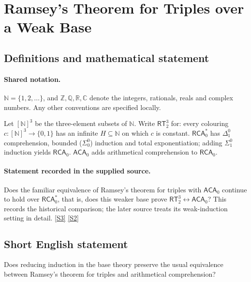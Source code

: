\documentclass[11pt]{article}
\newcommand{\sref}[2]{\hyperlink{source:#1:#2}{[S#2]}}
\begin{document}
\section{Ramsey's Theorem for Triples over a Weak Base}\label{statement}

\subsection{Definitions and mathematical statement}

\paragraph{Shared notation.}$\mathbb N=\{1,2,\ldots\}$, and $\mathbb Z,\mathbb Q,\mathbb R,\mathbb C$ denote the integers, rationals, reals and complex numbers. Any other conventions are specified locally.


Let $[\mathbb N]^3$ be the three-element subsets of $\mathbb N$. Write $\mathsf{RT}^3_2$ for: every colouring $c:[\mathbb N]^3\to\{0,1\}$ has an infinite $H\subseteq\mathbb N$ on which $c$ is constant. $\mathsf{RCA}_0^*$ has $\Delta^0_1$ comprehension, bounded ($\Sigma^0_0$) induction and total exponentiation; adding $\Sigma^0_1$ induction yields $\mathsf{RCA}_0$. $\mathsf{ACA}_0$ adds arithmetical comprehension to $\mathsf{RCA}_0$.
\paragraph{Statement recorded in the supplied source.}
Does the familiar equivalence of Ramsey's theorem for triples with $\mathsf{ACA}_0$ continue to hold over $\mathsf{RCA}_0^*$, that is, does this weaker base prove $\mathsf{RT}^3_2\leftrightarrow\mathsf{ACA}_0$? This records the historical comparison; the later source treats its weak-induction setting in detail. \sref{statement}{3} \sref{statement}{2}
\subsection{Short English statement}
Does reducing induction in the base theory preserve the usual equivalence between Ramsey's theorem for triples and arithmetical comprehension?
\end{document}
